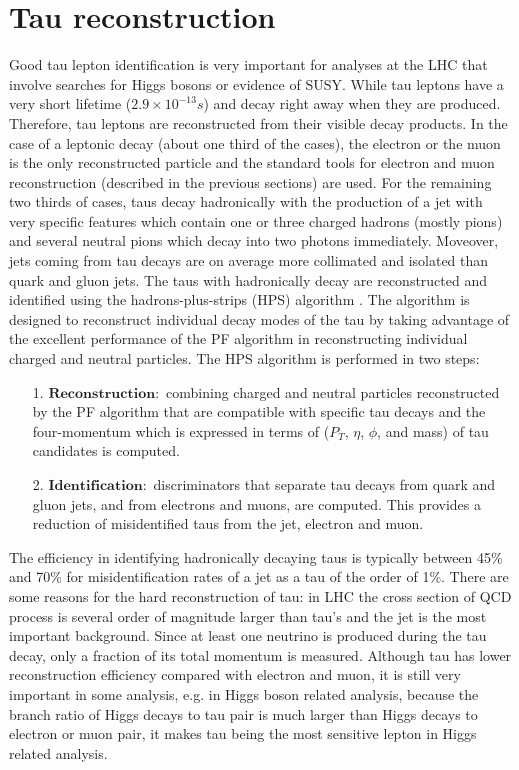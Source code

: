 \section{Tau reconstruction}\label{sec:taus}
Good tau lepton identification is very important for analyses at the LHC that involve searches for Higgs bosons or evidence of SUSY. While tau leptons have a very short lifetime ($2.9\times 10^{-13}s$) and decay right away when they are produced. Therefore, tau leptons are reconstructed from their visible decay products. In
the case of a leptonic decay (about one third of the cases), the electron or the muon is the only reconstructed particle and the standard tools for electron and muon reconstruction (described in the previous sections) are used. For the remaining two thirds of cases, taus decay hadronically with the production of a jet with very specific features which contain one or three charged hadrons (mostly pions) and several neutral pions which decay into two photons immediately. Moveover, jets coming from tau decays are on average more collimated and isolated than quark and gluon jets. The taus with hadronically decay are reconstructed and identified using the hadrons-plus-strips (HPS) algorithm \cite{tau-lepton,tau_2}. The algorithm is designed to reconstruct individual decay modes of the tau by taking advantage of the excellent performance of the PF algorithm in reconstructing individual charged and neutral particles. The HPS algorithm is performed in two steps:
\begin{enumerate}
\item[1.] $\mathbf{Reconstruction:}$ combining charged and neutral particles reconstructed by the PF algorithm that are compatible with specific tau decays and the four-momentum which is expressed in terms of ($P_{T}$, $\eta$, $\phi$, and mass) of tau candidates is computed.

\item[2.] $\mathbf{Identification:}$ discriminators that separate tau decays from quark and gluon jets, and from electrons and muons, are computed. This provides a reduction of misidentified taus from the jet, electron and muon.
\end{enumerate}

The efficiency in identifying hadronically decaying taus is typically between 45\% and 70\% for misidentification rates of a jet as a tau of the order of 1\%. There are some reasons for the hard reconstruction of tau: in LHC the cross section of QCD process is several order of magnitude larger than tau's and the jet is the most important background. Since at least one neutrino is produced during the tau decay, only a fraction of its total momentum is measured. Although tau has lower reconstruction efficiency compared with electron and muon, it is still very important in some analysis, e.g. in Higgs boson related analysis, because the branch ratio of Higgs decays to tau pair is much larger than Higgs decays to electron or muon pair, it makes tau being the most sensitive lepton in Higgs related analysis.

